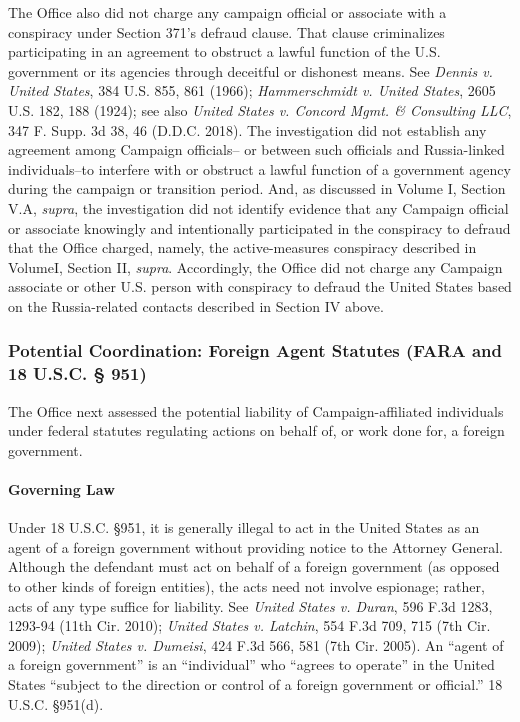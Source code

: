 The Office also did not charge any campaign official or associate with a conspiracy under Section 371's defraud clause.
That clause criminalizes participating in an agreement to obstruct a lawful function of the U.S. government or its agencies through deceitful or dishonest means.
See \textit{Dennis v. United States}, 384 U.S. 855, 861 (1966); \textit{Hammerschmidt v. United States}, 2605 U.S. 182, 188 (1924); see also \textit{United States v. Concord Mgmt. \& Consulting LLC}, 347 F. Supp. 3d 38, 46 (D.D.C. 2018).
The investigation did not establish any agreement among Campaign officials-- or between such officials and Russia-linked individuals--to interfere with or obstruct a lawful function of a government agency during the campaign or transition period.
And, as discussed in Volume I, Section V.A, \textit{supra}, the investigation did not identify evidence that any Campaign official or associate knowingly and intentionally participated in the conspiracy to defraud that the Office charged, namely, the active-measures conspiracy described in VolumeI, Section II, \textit{supra}.
Accordingly, the Office did not charge any Campaign associate or other U.S. person with conspiracy to defraud the United States based on the Russia-related contacts described in Section IV above.

\subsubsection{Potential Coordination: Foreign Agent Statutes (FARA and 18 U.S.C. § 951)}
The Office next assessed the potential liability of Campaign-affiliated individuals under federal statutes regulating actions on behalf of, or work done for, a foreign government.

\paragraph{Governing Law}
Under 18 U.S.C. \S 951, it is generally illegal to act in the United States as an agent of a foreign government without providing notice to the Attorney General.
Although the defendant must act on behalf of a foreign government (as opposed to other kinds of foreign entities), the acts need not involve espionage; rather, acts of any type suffice for liability.
See \textit{United States v. Duran}, 596 F.3d 1283, 1293-94 (11th Cir. 2010); \textit{United States v. Latchin}, 554 F.3d 709, 715 (7th Cir. 2009); \textit{United States v. Dumeisi}, 424 F.3d 566, 581 (7th Cir. 2005).
An ``agent of a foreign government'' is an ``individual'' who ``agrees to operate'' in the United States ``subject to the direction or control of a foreign government or official.'' 18 U.S.C. \S 951(d).


